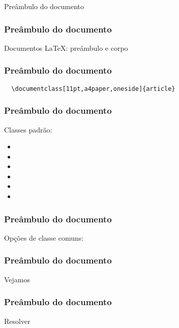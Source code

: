 \begin{frame}[standout]
  \Huge
  Preâmbulo do documento
\end{frame}

\begin{frame}
  \frametitle{Preâmbulo do documento}
  \LARGE
  Documentos \LaTeX: preâmbulo e corpo
\end{frame}

\begin{frame}[fragile]
  \frametitle{Preâmbulo do documento}
  \LARGE
  \begin{verbatim}
  \documentclass[11pt,a4paper,oneside]{article}
  \end{verbatim}
\end{frame}

\begin{frame}[fragile]
  \frametitle{Preâmbulo do documento}
  \huge
  Classes padrão:
  \begin{multicols}{2}
    \begin{itemize}
      \item{}
      \item{}
      \item{}
      \item{}
      \item{}
      \item{}
  \end{itemize}
\end{multicols}
\end{frame}

\begin{frame}
  \frametitle{Preâmbulo do documento}
  \LARGE
  Opções de classe comuns:
  \begin{itemize}
  \end{itemize}
\end{frame}

\begin{frame}
  \frametitle{Preâmbulo do documento}
  \huge
  Vejamos 
\end{frame}

\begin{frame}
  \frametitle{Preâmbulo do documento}
  \huge
  Resolver 
\end{frame}
